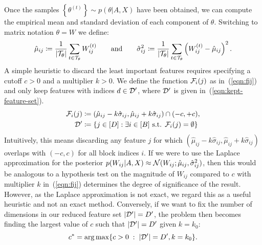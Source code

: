 Once the samples $\left\{ \theta^{(t)} \right\} \sim p(\theta | A, X)$
have been obtained, we can compute the empirical mean and standard deviation of each component of $\theta$. Switching to matrix notation $\theta = W$ we define:
%
\begin{equation}
	\hat{\mu}_{ij} \coloneqq \frac{1}{|\mathcal{T}_\theta|} \sum_{t \in \mathcal{T}_\theta} W_{ij}^{(t)} \qquad \textrm{and} \qquad
	\hat{\sigma}_{ij}^2 \coloneqq \frac{1}{|\mathcal{T}_\theta|} \sum_{t \in \mathcal{T}_\theta} \left( W_{ij}^{(t)} - \hat{\mu}_{ij} \right)^2.
\end{equation}
%
A simple heuristic to discard the least important features requires specifying a cutoff $c > 0$ and a multiplier $k > 0$. We define the function $\mathcal{F}_i(j)$ 
as in~(\ref{eqn:fij}) and only keep features with indices $d \in \mathcal{D}'$, where $\mathcal{D}'$ is given in~(\ref{eqn:kept-feature-set}).
%
\begin{align}
	\mathcal{F}_i(j) &\coloneqq (\hat{\mu}_{ij} - k \hat{\sigma}_{ij}, \hat{\mu}_{ij} + k \hat{\sigma}_{ij}) \cap (-c, +c),
	\label{eqn:fij} \\
	\mathcal{D}' &\coloneqq \left\{ j \in [D] : \exists i \in [B] \textrm{ s.t. }  \mathcal{F}_i(j) = \emptyset \right\}
	\label{eqn:kept-feature-set}
\end{align}
%
Intuitively, this means discarding any feature $j$ for which 
$(\hat{\mu}_{ij} - k\hat{\sigma}_{ij}, \hat{\mu}_{ij} + k \hat{\sigma}_{ij})$ overlaps with
$(-c, c)$ for all block indices $i$. If we were to use the Laplace approximation for the posterior $p(W_{ij} | A, X) \approx \mathcal{N}(W_{ij}; \hat{\mu}_{ij}, \hat{\sigma}_{ij}^2)$, then this would be analogous to a hypothesis test on the magnitude of $W_{ij}$ compared to $c$ with multiplier $k$ in~(\ref{eqn:fij}) determines the degree of significance of the result. However, as the Laplace approximation is not exact, we regard this as a useful heuristic and not an exact method. Conversely, if we want to fix the number of dimensions in our reduced feature set $|\mathcal{D}'|=D'$, the problem then becomes finding the largest value of $c$ such that $|\mathcal{D}'|=D'$ given $k=k_0$:
%
\begin{equation}
	c^* = \operatorname*{arg\,max} \{c>0\; : \;|\mathcal{D}'| = D', k=k_0\}.
	\label{eqn:c-star}
\end{equation}

